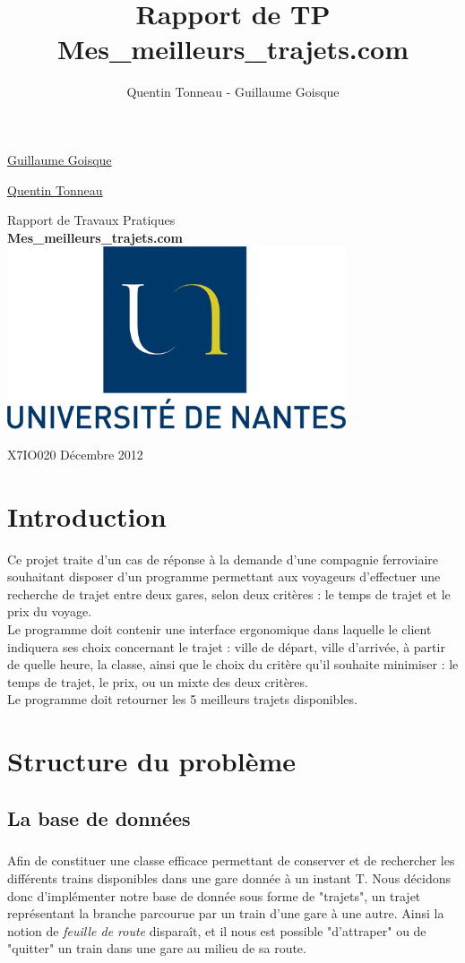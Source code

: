 \documentclass[a4paper,10pt,twoside]{report}
\title {Rapport de TP \\ Mes\_meilleurs\_trajets.com}
\author {Quentin Tonneau - Guillaume Goisque}
\date{}
\begin{document}
\thispagestyle{empty}
\Large{\uline{
\noindent Guillaume Goisque}


\uline{Quentin Tonneau}}
\vfill
\begin{center}
\Huge{
 Rapport de Travaux Pratiques\\
 \textbf{Mes\_meilleurs\_trajets.com}}
 \vfill
 \includegraphics[width=0.75\textwidth]{logo_univ_nantes.png}
 \vfill
\end{center}
X7IO020 \hfill Décembre 2012
\tableofcontents
\newpage
\pagestyle{plain}
\chapter{Introduction}
Ce projet traite d'un cas de réponse à la demande d'une compagnie ferroviaire souhaitant disposer d'un programme permettant aux voyageurs d'effectuer une recherche de trajet entre deux gares, selon deux critères : le temps de trajet et le prix du voyage.\\
Le programme doit contenir une interface ergonomique dans laquelle le client indiquera ses choix concernant le trajet : ville de départ, ville d'arrivée, à partir de quelle heure, la classe, ainsi que le choix du critère qu'il souhaite minimiser : le temps de trajet, le prix, ou un mixte des deux critères.\\
Le programme doit retourner les 5 meilleurs trajets disponibles.

\chapter{Structure du problème}
    \section{La base de données}
    
    
    \paragraph{}Afin de constituer une classe efficace permettant de conserver et de rechercher les différents trains disponibles dans une gare donnée à un instant T.
    Nous décidons donc d'implémenter notre base de donnée sous forme de "trajets", un trajet représentant la branche parcourue par un train d'une gare à une autre.
    Ainsi la notion de \textit{feuille de route} disparaît, et il nous est possible "d'attraper" ou de "quitter" un train dans une gare au milieu de sa route.
    
\end{document}
